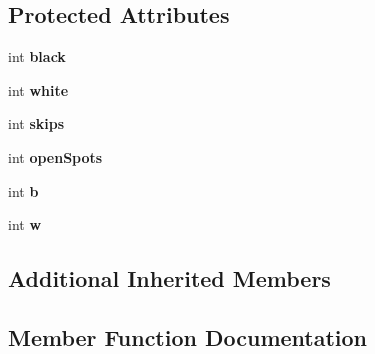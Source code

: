 \subsection*{Protected Attributes}
\begin{DoxyCompactItemize}
\item 
int {\bfseries black}\hypertarget{classmain__savitch__14_1_1Othello_a2eed818925f68d5678b78107a3298138}{}\label{classmain__savitch__14_1_1Othello_a2eed818925f68d5678b78107a3298138}

\item 
int {\bfseries white}\hypertarget{classmain__savitch__14_1_1Othello_a7d5f59b1e581ed7a8145debeecf4f310}{}\label{classmain__savitch__14_1_1Othello_a7d5f59b1e581ed7a8145debeecf4f310}

\item 
int {\bfseries skips}\hypertarget{classmain__savitch__14_1_1Othello_a85d4ce17512d8dbf85a313a27eea0644}{}\label{classmain__savitch__14_1_1Othello_a85d4ce17512d8dbf85a313a27eea0644}

\item 
int {\bfseries open\+Spots}\hypertarget{classmain__savitch__14_1_1Othello_a15045e3e94c34afe08240885e230d502}{}\label{classmain__savitch__14_1_1Othello_a15045e3e94c34afe08240885e230d502}

\item 
int {\bfseries b}\hypertarget{classmain__savitch__14_1_1Othello_a98fbc46241d2f5e05ccb4b66f11535bf}{}\label{classmain__savitch__14_1_1Othello_a98fbc46241d2f5e05ccb4b66f11535bf}

\item 
int {\bfseries w}\hypertarget{classmain__savitch__14_1_1Othello_a1b11c5fe33e30a94ed39e8cb55caf37e}{}\label{classmain__savitch__14_1_1Othello_a1b11c5fe33e30a94ed39e8cb55caf37e}

\end{DoxyCompactItemize}
\subsection*{Additional Inherited Members}


\subsection{Member Function Documentation}
